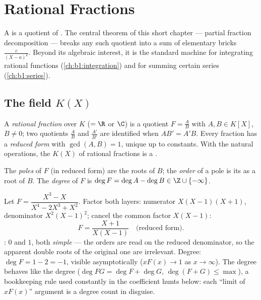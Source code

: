 \chapter{Rational Fractions}\label{ch:b1:fractions}

A  is a quotient of . The central theorem
of this short chapter --- partial fraction
decomposition --- breaks any
such quotient into a sum of elementary bricks $\frac{c}{(X - a)^k}$.
Beyond its algebraic interest, it is the standard machine for
integrating rational functions (\cref{ch:b1:integration}) and for
summing certain series (\cref{ch:b1:series}).

\section{The field $K(X)$}

\begin{definition}\label{def:b1:fractions:field}
A \emph{rational fraction} over $K$ ($= \R$
or $\C$) is a quotient $F = \frac{A}{B}$ with $A, B \in K[X]$, $B \neq
0$; two quotients $\frac AB$ and $\frac{A'}{B'}$ are identified when
$AB' = A'B$. Every fraction has a \emph{reduced form} with
$\gcd(A, B) = 1$, unique up to constants. With the natural operations,
the  $K(X)$ of rational fractions is a .

The \emph{poles} of $F$ (in reduced form) are the roots of
$B$; the \emph{order} of a pole is its  as a root of $B$.
The \emph{degree} of $F$ is $\deg F = \deg A - \deg B \in \Z \cup
\{-\infty\}$.
\end{definition}

\begin{example}\label{ex:b1:fractions:vocab}
Let $F = \dfrac{X^3 - X}{X^4 - 2X^3 + X^2}$. Factor both layers:
numerator $X(X-1)(X+1)$, denominator $X^2(X-1)^2$; cancel the
common factor $X(X-1)$:
\[
F = \frac{X + 1}{X(X - 1)} \quad\text{(reduced form).}
\]
: $0$ and $1$, both \emph{simple} --- the orders are read on
the reduced denominator, so the apparent double roots of the
original one are irrelevant. Degree: $\deg F = 1 - 2 = -1$,
visible asymptotically ($xF(x) \to 1$ as $x \to \infty$). The
degree behaves like the  degree ($\deg FG = \deg F +
\deg G$, $\deg(F + G) \leq \max$), a bookkeeping rule used
constantly in the coefficient hunts below: each ``limit of
$xF(x)$'' argument is a degree count in disguise.
\end{example}

